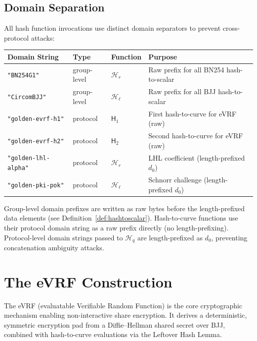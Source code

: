 \documentclass[11pt,a4paper]{article}
\newcommand{\hash}{\mathcal{H}}
\newcommand{\hashcurve}{\mathsf{H}}
\begin{document}
\subsection{Domain Separation}
\label{sec:domains}

All hash function invocations use distinct domain separators to prevent
cross-protocol attacks:

\begin{center}
\renewcommand{\arraystretch}{1.3}
\begin{tabular}{@{}lllp{4cm}@{}}
\toprule
\textbf{Domain String} & \textbf{Type} & \textbf{Function} & \textbf{Purpose} \\
\midrule
\texttt{"BN254G1"} & group-level & $\hash_r$ & Raw prefix for all BN254 hash-to-scalar \\
\texttt{"CircomBJJ"} & group-level & $\hash_\ell$ & Raw prefix for all BJJ hash-to-scalar \\
\texttt{"golden-evrf-h1"} & protocol & $\hashcurve_1$ & First hash-to-curve for eVRF (raw) \\
\texttt{"golden-evrf-h2"} & protocol & $\hashcurve_2$ & Second hash-to-curve for eVRF (raw) \\
\texttt{"golden-lhl-alpha"} & protocol & $\hash_r$ & LHL coefficient (length-prefixed $d_0$) \\
\texttt{"golden-pki-pok"} & protocol & $\hash_\ell$ & Schnorr challenge (length-prefixed $d_0$) \\
\bottomrule
\end{tabular}
\end{center}

Group-level domain prefixes are written as raw bytes before the length-prefixed
data elements (see Definition~\ref{def:hashtoscalar}). Hash-to-curve functions
use their protocol domain string as a raw prefix directly (no length-prefixing).
Protocol-level domain strings passed to $\hash_q$ are length-prefixed as $d_0$,
preventing concatenation ambiguity attacks.

\section{The eVRF Construction}
\label{sec:evrf}

The eVRF (evaluatable Verifiable Random Function) is the core cryptographic
mechanism enabling non-interactive share encryption. It derives a
deterministic, symmetric encryption pad from a Diffie--Hellman shared secret
over BJJ, combined with hash-to-curve evaluations via the Leftover Hash Lemma.
\end{document}
